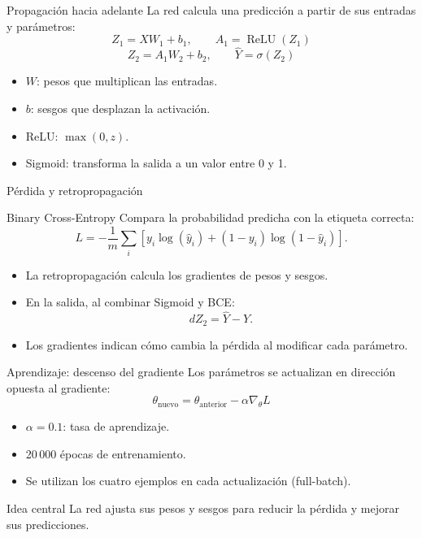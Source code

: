 \documentclass[aspectratio=169]{beamer}
\begin{document}
\begin{frame}{Propagación hacia adelante}
La red calcula una predicción a partir de sus entradas y parámetros:
\[
Z_1=XW_1+b_1,\qquad A_1=\operatorname{ReLU}(Z_1)
\]
\[
Z_2=A_1W_2+b_2,\qquad \hat{Y}=\sigma(Z_2)
\]
\begin{itemize}
    \item $W$: pesos que multiplican las entradas.
    \item $b$: sesgos que desplazan la activación.
    \item ReLU: $\max(0,z)$.
    \item Sigmoid: transforma la salida a un valor entre 0 y 1.
\end{itemize}
\end{frame}

\begin{frame}{Pérdida y retropropagación}
\begin{block}{Binary Cross-Entropy}
Compara la probabilidad predicha con la etiqueta correcta:
\[
L=-\frac{1}{m}\sum_i
[y_i\log(\hat y_i)+(1-y_i)\log(1-\hat y_i)].
\]
\end{block}
\begin{itemize}
    \item La retropropagación calcula los gradientes de pesos y sesgos.
    \item En la salida, al combinar Sigmoid y BCE:
    \[
    dZ_2=\hat{Y}-Y.
    \]
    \item Los gradientes indican cómo cambia la pérdida al modificar cada parámetro.
\end{itemize}
\end{frame}

\begin{frame}{Aprendizaje: descenso del gradiente}
Los parámetros se actualizan en dirección opuesta al gradiente:
\[
\theta_{\text{nuevo}}=\theta_{\text{anterior}}-\alpha\nabla_\theta L
\]
\begin{itemize}
    \item $\alpha=0.1$: tasa de aprendizaje.
    \item 20\,000 épocas de entrenamiento.
    \item Se utilizan los cuatro ejemplos en cada actualización (full-batch).
\end{itemize}
\begin{block}{Idea central}
La red ajusta sus pesos y sesgos para reducir la pérdida y mejorar sus predicciones.
\end{block}
\end{frame}
\end{document}
